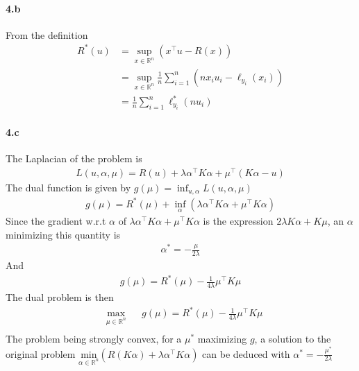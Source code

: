 \documentclass[10pt]{article}
\begin{document}
    \paragraph{4.b} From the definition
    \begin{align*}
        R^*(u) &= \sup_{x \in \mathbb{R}^n}\left( x^\top u - R(x) \right) \\
        &= \sup_{x \in \mathbb{R}^n} \frac{1}{n}\sum_{i=1}^n (nx_i u_i - 
        \ell_{y_i}(x_i))\\
        &= \frac{1}{n}\sum_{i=1}^n \ell^*_{y_i}(nu_i)
    \end{align*}
        
    \paragraph{4.c} The Laplacian of the problem is 
    \begin{align*}
        L(u, \alpha, \mu) = R(u) + \lambda \alpha^\top K \alpha + \mu^\top (
        K\alpha - u)
    \end{align*}
    The dual function is given by $g(\mu) = \inf_{u, \alpha} L(u, \alpha, \mu)$
    \begin{align*}
        g(\mu) = R^*(\mu) + \inf_{\alpha}(\lambda\alpha^\top K \alpha + 
        \mu^\top K\alpha)
    \end{align*}
    Since the gradient w.r.t $\alpha$ of $\lambda\alpha^\top K \alpha + 
    \mu^\top K\alpha$ is the expression $2\lambda K \alpha  + K\mu$, an $\alpha$
    minimizing this quantity is 
    \begin{align*}
        \alpha^* = -\frac{\mu}{2\lambda}
    \end{align*} 
    And 
    \begin{align*}
        g(\mu) = R^*(\mu) - \frac{1}{4\lambda}\mu^\top K \mu
    \end{align*}
    The dual problem is then
    \begin{equation*}
        \begin{aligned}
        & \underset{\mu\in\mathbb{R}^n}{\text{max}}
        & & g(\mu) = R^*(\mu) - \frac{1}{4\lambda}\mu^\top K \mu\\
        \end{aligned}
    \end{equation*} 
    The problem being strongly convex, for a $\mu^*$ maximizing $g$, a solution 
    to the original problem 
    $\underset{\alpha\in\mathbb{R}^n}{\text{min}} (R(K\alpha) + 
    \lambda \alpha^\top K \alpha)$
    can be deduced with $\alpha^* = -\frac{\mu^*}{2\lambda}$
\end{document}
